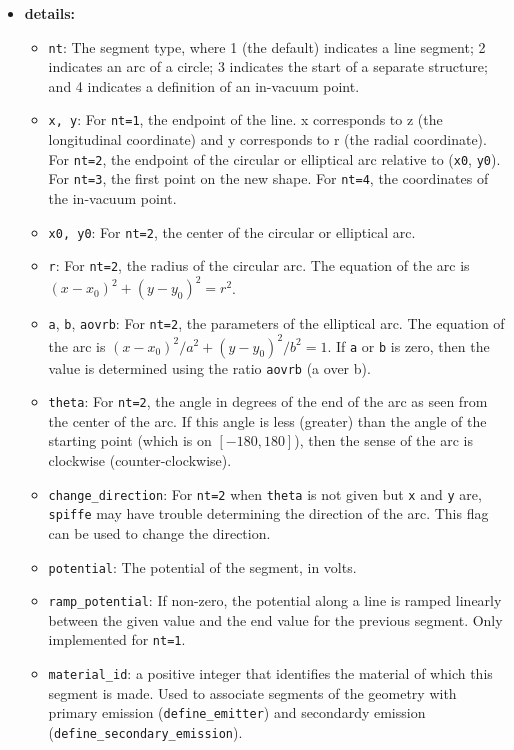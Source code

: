 \begin{itemize}
\item {\bf details:}
\begin{itemize}
\item {\tt nt}: The segment type, where 1 (the default) indicates a line segment;
        2 indicates an arc of a circle; 3 indicates the start of a separate
        structure; and 4 indicates a definition of an in-vacuum point.
\item {\tt x, y}: For {\tt nt=1}, the endpoint of the line.  x corresponds to z 
        (the longitudinal coordinate) and y corresponds to r (the radial coordinate).
        For {\tt nt=2}, the endpoint of the circular or elliptical arc relative to (\verb|x0|, \verb|y0|).
        For {\tt nt=3}, the first point on the new shape.  For {\tt nt=4},
        the coordinates of the in-vacuum point.
\item {\tt x0, y0}: For {\tt nt=2}, the center of the circular or elliptical arc.
\item {\tt r}: For {\tt nt=2}, the radius of the circular arc. The equation of the arc is
$(x-x_0)^2 + (y-y_0)^2 = r^2$.
\item {\tt a}, {\tt b}, {\tt aovrb}: For {\tt nt=2}, the parameters of the elliptical arc.
The equation of the arc is 
$(x-x_0)^2/a^2 + (y-y_0)^2/b^2 = 1$.
If \verb|a| or \verb|b| is zero, then the value is determined using the ratio \verb|aovrb| (a over b).
\item {\tt theta}: For {\tt nt=2}, the angle in degrees of the end of the arc as seen from the
        center of the arc.  If this angle is less (greater) than the angle of the starting
        point (which is on $[-180, 180]$), then the sense of the arc is clockwise (counter-clockwise).
\item {\tt change\_direction}: For \verb|nt=2| when \verb|theta| is not given but \verb|x| and \verb|y| are,
  \verb|spiffe| may have trouble determining the direction of the arc. This flag can be used to change the
  direction.
\item {\tt potential}: The potential of the segment, in volts.
\item {\tt ramp\_potential}: If non-zero, the potential along a line is ramped linearly between the
  given value and the end value for the previous segment.  Only implemented for {\tt nt=1}.
\item \verb|material_id|: a positive integer that identifies the material of which this segment is
  made. Used to associate segments of the geometry with primary emission (\verb|define_emitter|) and
  secondardy emission (\verb|define_secondary_emission|).
\end{itemize}

\end{itemize}
